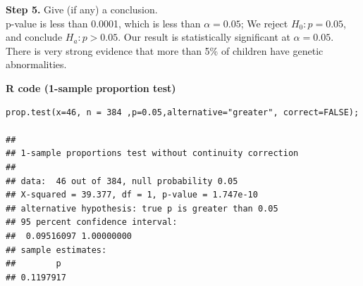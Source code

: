 \begin{example}
\vspace{1em}
\textbf{Step 5.} Give (if any) a conclusion.\\
p-value is less than 0.0001, which is less than $\alpha = 0.05$; We reject $H_0 : p = 0.05$, and conclude $H_a : p > 0.05$. Our result is statistically significant at $\alpha = 0.05$.\\
There is very strong evidence that more than 5\% of children have genetic abnormalities. 

\vspace{1em}
\noindent\textbf{R code (1-sample proportion test)}

\begin{tcolorbox}[colback=gray!10, colframe=black!45, arc=2mm]
\begin{verbatim}
prop.test(x=46, n = 384 ,p=0.05,alternative="greater", correct=FALSE);

##
## 1-sample proportions test without continuity correction
##
## data:  46 out of 384, null probability 0.05
## X-squared = 39.377, df = 1, p-value = 1.747e-10
## alternative hypothesis: true p is greater than 0.05
## 95 percent confidence interval:
##  0.09516097 1.00000000
## sample estimates:
##        p 
## 0.1197917 
\end{verbatim}
\end{tcolorbox}

\end{example}
